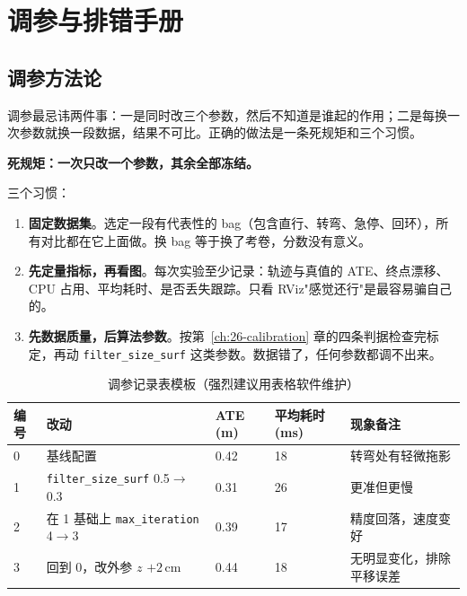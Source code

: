 \chapter{调参与排错手册}\label{ch:27-tuning}
\usetikzlibrary{arrows.meta}


\section{调参方法论}\label{sec:27-method}

调参最忌讳两件事：一是同时改三个参数，然后不知道是谁起的作用；二是每换一次参数就换一段数据，结果不可比。正确的做法是一条死规矩和三个习惯。

\textbf{死规矩：一次只改一个参数，其余全部冻结。}

三个习惯：

\begin{enumerate}
  \item \textbf{固定数据集}。选定一段有代表性的 bag（包含直行、转弯、急停、回环），所有对比都在它上面做。换 bag 等于换了考卷，分数没有意义。
  \item \textbf{先定量指标，再看图}。每次实验至少记录：轨迹与真值的 ATE、终点漂移、CPU 占用、平均耗时、是否丢失跟踪。只看 RViz"感觉还行"是最容易骗自己的。
  \item \textbf{先数据质量，后算法参数}。按第~\ref{ch:26-calibration} 章的四条判据检查完标定，再动 \lstinline{filter_size_surf} 这类参数。数据错了，任何参数都调不出来。
\end{enumerate}

\begin{table}[htbp]
  \centering
  \caption{调参记录表模板（强烈建议用表格软件维护）}\label{tab:27-log}
  \small
  \begin{tabular}{lllll}
    \toprule
    编号 & 改动 & ATE (m) & 平均耗时 (ms) & 现象备注 \\
    \midrule
    0  & 基线配置 & 0.42 & 18 & 转弯处有轻微拖影 \\
    1  & \lstinline{filter_size_surf} 0.5$\to$0.3 & 0.31 & 26 & 更准但更慢 \\
    2  & 在 1 基础上 \lstinline{max_iteration} 4$\to$3 & 0.39 & 17 & 精度回落，速度变好 \\
    3  & 回到 0，改外参 $z$ $+2$\,cm & 0.44 & 18 & 无明显变化，排除平移误差 \\
    \bottomrule
  \end{tabular}
\end{table}

